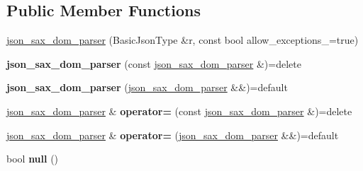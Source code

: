\subsection*{Public Member Functions}
\begin{DoxyCompactItemize}
\item 
\mbox{\hyperlink{classnlohmann_1_1detail_1_1json__sax__dom__parser_afc50fee0a92ce84afb84041ebbdfba80}{json\+\_\+sax\+\_\+dom\+\_\+parser}} (Basic\+Json\+Type \&r, const bool allow\+\_\+exceptions\+\_\+=true)
\item 
\mbox{\label{classnlohmann_1_1detail_1_1json__sax__dom__parser_a0a00cd158d678e294f6e974cd9373c4b}} 
{\bfseries json\+\_\+sax\+\_\+dom\+\_\+parser} (const \mbox{\hyperlink{classnlohmann_1_1detail_1_1json__sax__dom__parser}{json\+\_\+sax\+\_\+dom\+\_\+parser}} \&)=delete
\item 
\mbox{\label{classnlohmann_1_1detail_1_1json__sax__dom__parser_ad6e588652d5a9cb647a3c32a6221f13e}} 
{\bfseries json\+\_\+sax\+\_\+dom\+\_\+parser} (\mbox{\hyperlink{classnlohmann_1_1detail_1_1json__sax__dom__parser}{json\+\_\+sax\+\_\+dom\+\_\+parser}} \&\&)=default
\item 
\mbox{\label{classnlohmann_1_1detail_1_1json__sax__dom__parser_a98448bf2cbc15d15e2eddc5a09a40a42}} 
\mbox{\hyperlink{classnlohmann_1_1detail_1_1json__sax__dom__parser}{json\+\_\+sax\+\_\+dom\+\_\+parser}} \& {\bfseries operator=} (const \mbox{\hyperlink{classnlohmann_1_1detail_1_1json__sax__dom__parser}{json\+\_\+sax\+\_\+dom\+\_\+parser}} \&)=delete
\item 
\mbox{\label{classnlohmann_1_1detail_1_1json__sax__dom__parser_aff928a07e40e4efb16b3ff9384f4401c}} 
\mbox{\hyperlink{classnlohmann_1_1detail_1_1json__sax__dom__parser}{json\+\_\+sax\+\_\+dom\+\_\+parser}} \& {\bfseries operator=} (\mbox{\hyperlink{classnlohmann_1_1detail_1_1json__sax__dom__parser}{json\+\_\+sax\+\_\+dom\+\_\+parser}} \&\&)=default
\item 
\mbox{\label{classnlohmann_1_1detail_1_1json__sax__dom__parser_abb06babaa861f123d8d0cb443b887d8a}} 
bool {\bfseries null} ()

\end{DoxyCompactItemize}
